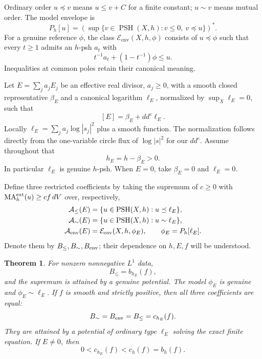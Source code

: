 \documentclass[11pt]{article}
\newcommand{\ddc}{dd^c}
\newcommand{\MA}{\operatorname{MA}}
\newcommand{\PSH}{\operatorname{PSH}}
\newcommand{\Eenv}{\mathcal E_{\mathrm{env}}}
\newtheorem{theorem}{Theorem}
\theoremstyle{remark}\newtheorem{remark}[theorem]{Remark}
\begin{document}
Ordinary order $u\preceq v$ means $u\leq v+C$ for a finite constant;
$u\sim v$ means mutual order. The model envelope is
\[
 P_h[u]=\left(\sup\{v\in\PSH(X,h):v\leq0,\ v\preceq u\}\right)^*.
\]
For a genuine reference $\phi$, the class $\Eenv(X,h,\phi)$ consists
of $u\preceq\phi$ such that every $t\geq1$ admits an $h$-psh $a_t$ with
\[
 t^{-1}a_t+(1-t^{-1})\phi\leq u.
\]
Inequalities at common poles retain their canonical meaning.

Let $E=\sum_j a_j E_j$ be an effective real divisor, $a_j\geq0$,
with a smooth closed representative $\beta_E$ and a canonical logarithm
$\ell_E$, normalized by $\sup_X\ell_E=0$, such that
\[
 [E]=\beta_E+\ddc\ell_E.
\]
Locally $\ell_E=\sum_j a_j\log|s_j|^2$ plus a smooth function.
The normalization follows directly from the one-variable circle flux
of $\log|s|^2$ for our $\ddc$. Assume throughout that
\begin{equation}\label{eq:residual}
 h_E=h-\beta_E>0.
\end{equation}
In particular $\ell_E$ is genuine $h$-psh. When $E=0$, take
$\beta_E=0$ and $\ell_E=0$.

Define three restricted coefficients by taking the supremum of $c\geq0$
with $\MA_h^{\rm ext}(u)\geq cf\,dV$ over, respectively,
\[
 \begin{split}
 \mathcal A_{\leq}(E)&=\{u\in\PSH(X,h):u\preceq\ell_E\},\\
 \mathcal A_{\sim}(E)&=\{u\in\PSH(X,h):u\sim\ell_E\},\\
 \mathcal A_{\rm env}(E)&=\Eenv(X,h,\phi_E),
       \qquad \phi_E=P_h[\ell_E].
 \end{split}
\]
Denote them by $B_{\leq},B_{\sim},B_{\rm env}$; their dependence on
$h,E,f$ will be understood.

\begin{theorem}\label{th:threshold}
For nonzero nonnegative $L^1$ data,
\[
 B_{\leq}=b_{h_E}(f),
\]
and the supremum is attained by a genuine potential. The model
$\phi_E$ is genuine and $\phi_E\sim\ell_E$. If $f$ is smooth and
strictly positive, then all three coefficients are equal:
\[
 B_{\sim}=B_{\rm env}=B_{\leq}=c_{h_E}(f).
\]
They are attained by a potential of ordinary type $\ell_E$ solving the
exact finite equation. If $E\ne0$, then
\begin{equation}\label{eq:strict}
 0<c_{h_E}(f)<c_h(f)=b_h(f).
\end{equation}
\end{theorem}
\end{document}
